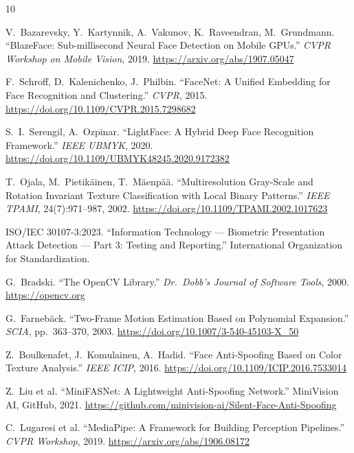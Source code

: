 \documentclass[11pt,a4paper]{article}
\begin{document}
\begin{thebibliography}{10}

  V.~Bazarevsky, Y.~Kartynnik, A.~Vakunov, K.~Raveendran, M.~Grundmann.
  ``BlazeFace: Sub-millisecond Neural Face Detection on Mobile GPUs.''
  \textit{CVPR Workshop on Mobile Vision}, 2019.
  \url{https://arxiv.org/abs/1907.05047}

  F.~Schroff, D.~Kalenichenko, J.~Philbin.
  ``FaceNet: A Unified Embedding for Face Recognition and Clustering.''
  \textit{CVPR}, 2015.
  \url{https://doi.org/10.1109/CVPR.2015.7298682}

  S.~I.~Serengil, A.~Ozpinar.
  ``LightFace: A Hybrid Deep Face Recognition Framework.''
  \textit{IEEE UBMYK}, 2020.
  \url{https://doi.org/10.1109/UBMYK48245.2020.9172382}

  T.~Ojala, M.~Pietik\"{a}inen, T.~M\"{a}enp\"{a}\"{a}.
  ``Multiresolution Gray-Scale and Rotation Invariant Texture Classification
  with Local Binary Patterns.''
  \textit{IEEE TPAMI}, 24(7):971--987, 2002.
  \url{https://doi.org/10.1109/TPAMI.2002.1017623}

  ISO/IEC 30107-3:2023.
  ``Information Technology --- Biometric Presentation Attack Detection ---
  Part 3: Testing and Reporting.''
  International Organization for Standardization.

  G.~Bradski.
  ``The OpenCV Library.''
  \textit{Dr.\ Dobb's Journal of Software Tools}, 2000.
  \url{https://opencv.org}

  G.~Farneb\"{a}ck.
  ``Two-Frame Motion Estimation Based on Polynomial Expansion.''
  \textit{SCIA}, pp.~363--370, 2003.
  \url{https://doi.org/10.1007/3-540-45103-X\_50}

  Z.~Boulkenafet, J.~Komulainen, A.~Hadid.
  ``Face Anti-Spoofing Based on Color Texture Analysis.''
  \textit{IEEE ICIP}, 2016.
  \url{https://doi.org/10.1109/ICIP.2016.7533014}

  Z.~Liu et al.
  ``MiniFASNet: A Lightweight Anti-Spoofing Network.''
  MiniVision AI, GitHub, 2021.
  \url{https://github.com/minivision-ai/Silent-Face-Anti-Spoofing}

  C.~Lugaresi et al.
  ``MediaPipe: A Framework for Building Perception Pipelines.''
  \textit{CVPR Workshop}, 2019.
  \url{https://arxiv.org/abs/1906.08172}

\end{thebibliography}
\end{document}
